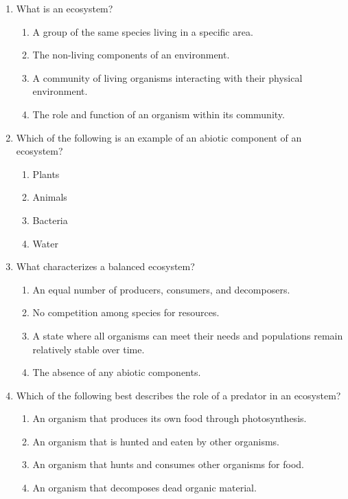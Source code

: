 \documentclass{article}
\begin{document}
\begin{enumerate}
    \item What is an ecosystem?
    \begin{enumerate}
        \item A group of the same species living in a specific area.
        \item The non-living components of an environment.
        \item A community of living organisms interacting with their physical environment.
        \item The role and function of an organism within its community.
    \end{enumerate}

    \item Which of the following is an example of an abiotic component of an ecosystem?
    \begin{enumerate}
        \item Plants
        \item Animals
        \item Bacteria
        \item Water
    \end{enumerate}

    \item What characterizes a balanced ecosystem?
    \begin{enumerate}
        \item An equal number of producers, consumers, and decomposers.
        \item No competition among species for resources.
        \item A state where all organisms can meet their needs and populations remain relatively stable over time.
        \item The absence of any abiotic components.
    \end{enumerate}

    \item Which of the following best describes the role of a predator in an ecosystem?
    \begin{enumerate}
        \item An organism that produces its own food through photosynthesis.
        \item An organism that is hunted and eaten by other organisms.
        \item An organism that hunts and consumes other organisms for food.
        \item An organism that decomposes dead organic material.
    \end{enumerate}


\end{enumerate}
\end{document}

